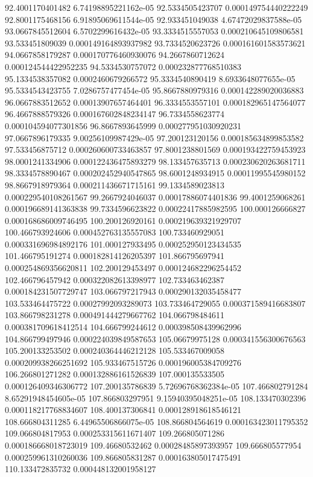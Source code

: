 {92.4001170401482 6.74198895221162e-05
92.5334505423707 0.000149754440222249
92.8001175468156 6.91895069611544e-05
92.933451049038 4.67472029837588e-05
93.0667845512604 6.5702299616432e-05
93.3334515557053 0.000210645109806581
93.533451809039 0.000149164893937982
93.7334520623726 0.000161601583573621
94.0667858179287 0.000170776460930076
94.2667860712624 0.000124544422952235
94.5334530757072 0.000232877768510383
95.1334538357082 0.0002460679266572
95.3334540890419 8.6933648077655e-05
95.5334543423755 7.0286757477454e-05
95.8667880979316 0.000142289020036883
96.0667883512652 0.00013907657464401
96.3334553557101 0.000182965147564077
96.4667888579326 0.000167602848234147
96.7334558623774 0.000104594077301856
96.8667893645999 0.000277951030920231
97.0667896179335 9.00256109987429e-05
97.200123120156 0.000185634899853582
97.533456875712 0.000260600733463857
97.8001238801569 0.000193422759453923
98.0001241334906 0.000122436475893279
98.133457635713 0.000230620263681711
98.3334578890467 0.000202452940547865
98.6001248934915 0.00011995545980152
98.8667918979364 0.000211436671715161
99.1334589023813 0.000229540108261567
99.2667924046037 0.00017886074401836
99.4001259068261 0.000196689141363838
99.7334596623822 0.00022417885982595
100.000126666827 0.000168686009746495
100.200126920161 0.000219639321929707
100.466793924606 0.000452763135557083
100.733460929051 0.000331696984892176
101.000127933495 0.000252950123434535
101.466795191274 0.000182814126205397
101.866795697941 0.000254869356620811
102.200129453497 0.000124682296254452
102.466796457942 0.000322082613398977
102.733463462387 0.000184231507729747
103.066797217943 0.000290132035458477
103.533464475722 0.00027992093289073
103.733464729055 0.000371589416683807
103.866798231278 0.000491444279667762
104.066798484611 0.000381709618412514
104.666799244612 0.000398508439962996
104.866799497946 0.000224039849587653
105.06679975128 0.000341556300676563
105.200133253502 0.000240364446212128
105.533467009058 0.000209938266251692
105.933467515726 0.000196005384709276
106.266801271282 0.000132886161526839
107.000135533505 0.000126409346306772
107.200135786839 5.72696768362384e-05
107.466802791284 8.65291948454605e-05
107.866803297951 9.15940395048251e-05
108.133470302396 0.000118217768834607
108.400137306841 0.000128918618546121
108.666804311285 6.44965506866075e-05
108.866804564619 0.000163423011795352
109.066804817953 0.000253315611671407
109.266805071286 0.000186668018723019
109.46680532462 0.00028485897393957
109.666805577954 0.000259961310260036
109.866805831287 0.000163805017475491
110.133472835732 0.000448132001958127
}
